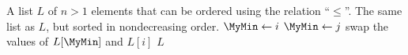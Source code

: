 
\begin{algorithmic}[1]
\Require A list $L$ of $n > 1$ elements that can be ordered using the
  relation ``$\leq$''.
\Ensure The same list as $L$, but sorted in nondecreasing order.
  \State $\MyMin \gets i$
      \State $\MyMin \gets j$
    \EndIf
  \EndFor
  \State swap the values of $L[\MyMin]$ and $L[i]$\label{alg:selection_sort:swap_values}
\EndFor
\State \Return $L$
\end{algorithmic}
